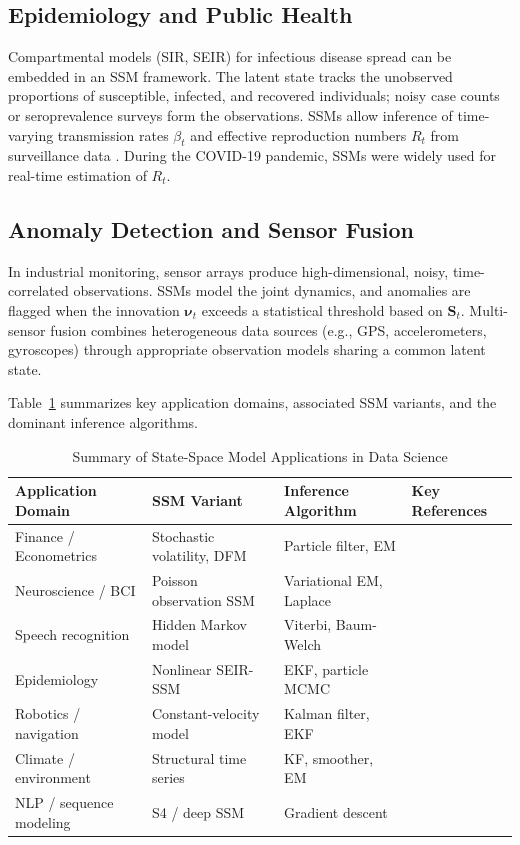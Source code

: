 \documentclass[conference]{IEEEtran}
\begin{document}
\subsection{Epidemiology and Public Health}

Compartmental models (SIR, SEIR) for infectious disease spread can be embedded in an SSM framework. The latent state tracks the unobserved proportions of susceptible, infected, and recovered individuals; noisy case counts or seroprevalence surveys form the observations. SSMs allow inference of time-varying transmission rates $\beta_t$ and effective reproduction numbers $R_t$ from surveillance data \cite{durbin2012time}. During the COVID-19 pandemic, SSMs were widely used for real-time estimation of $R_t$.

\subsection{Anomaly Detection and Sensor Fusion}

In industrial monitoring, sensor arrays produce high-dimensional, noisy, time-correlated observations. SSMs model the joint dynamics, and anomalies are flagged when the innovation $\boldsymbol{\nu}_t$ exceeds a statistical threshold based on $\mathbf{S}_t$. Multi-sensor fusion combines heterogeneous data sources (e.g., GPS, accelerometers, gyroscopes) through appropriate observation models sharing a common latent state.

Table~\ref{tab:applications} summarizes key application domains, associated SSM variants, and the dominant inference algorithms.

\begin{table}[htbp]
\centering
\caption{Summary of State-Space Model Applications in Data Science}
\label{tab:applications}
\begin{tabular}{p{3.2cm}p{4.2cm}p{3.8cm}p{4.0cm}}
\toprule
\textbf{Application Domain} & \textbf{SSM Variant} & \textbf{Inference Algorithm} & \textbf{Key References} \\
\midrule
Finance / Econometrics & Stochastic volatility, DFM & Particle filter, EM & \cite{kim1998stochastic,stock2002forecasting} \\
Neuroscience / BCI & Poisson observation SSM & Variational EM, Laplace & \cite{macke2011empirical,yu2009gaussian} \\
Speech recognition & Hidden Markov model & Viterbi, Baum-Welch & \cite{rabiner1989tutorial} \\
Epidemiology & Nonlinear SEIR-SSM & EKF, particle MCMC & \cite{durbin2012time} \\
Robotics / navigation & Constant-velocity model & Kalman filter, EKF & \cite{thrun2005probabilistic} \\
Climate / environment & Structural time series & KF, smoother, EM & \cite{west1997bayesian} \\
NLP / sequence modeling & S4 / deep SSM & Gradient descent & \cite{gu2021efficiently} \\
\bottomrule
\end{tabular}
\end{table}
\end{document}
